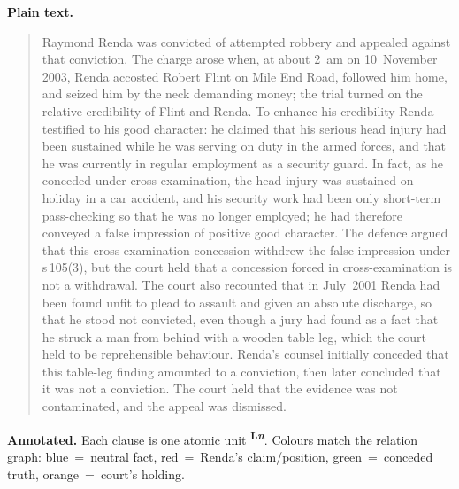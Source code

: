 \documentclass[11pt]{article}
\begin{document}
\noindent\textbf{Plain text.}
\begin{quote}
Raymond Renda was convicted of attempted robbery and appealed against that
conviction. The charge arose when, at about 2~am on 10~November 2003, Renda
accosted Robert Flint on Mile End Road, followed him home, and seized him by the
neck demanding money; the trial turned on the relative credibility of Flint and
Renda. To enhance his credibility Renda testified to his good character: he
claimed that his serious head injury had been sustained while he was serving on
duty in the armed forces, and that he was currently in regular employment as a
security guard. In fact, as he conceded under cross-examination, the head injury
was sustained on holiday in a car accident, and his security work had been only
short-term pass-checking so that he was no longer employed; he had therefore
conveyed a false impression of positive good character. The defence argued that
this cross-examination concession withdrew the false impression under s\,105(3),
but the court held that a concession forced in cross-examination is not a
withdrawal. The court also recounted that in July~2001 Renda had been found unfit
to plead to assault and given an absolute discharge, so that he stood not
convicted, even though a jury had found as a fact that he struck a man from
behind with a wooden table leg, which the court held to be reprehensible
behaviour. Renda's counsel initially conceded that this table-leg finding
amounted to a conviction, then later concluded that it was not a conviction. The
court held that the evidence was not contaminated, and the appeal was dismissed.
\end{quote}

\noindent\textbf{Annotated.} Each clause is one atomic unit
\textsuperscript{\textbf{\scriptsize L\textit{n}}}. Colours match the relation
graph: blue~=~neutral fact, red~=~Renda's claim/position, green~=~conceded truth,
orange~=~court's holding.
\end{document}
